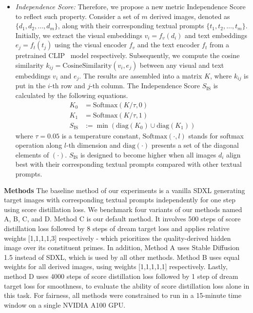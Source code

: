 \begin{itemize}
\item \emph{Independence Score:} Therefore, we propose a new metric Independence Score to reflect such property. Consider a set of $m$ derived images, denoted as $\{d_1, d_2, \ldots, d_m\}$, along with their corresponding textual prompts $\{t_1, t_2, \ldots, t_m\}$. Initially, we extract the visual embeddings $v_i=f_v(d_i)$ and text embeddings $e_j=f_t(t_j)$ using the visual encoder $f_v$ and the text encoder $f_t$ from a pretrained CLIP~\cite{radford2021learning} model respectively. Subsequently, we compute the cosine similarity $k_{ij}=\text{CosineSimilarity}(v_i, e_j)$ between any visual and text embeddings $v_i$ and $e_j$. The results are assembled into a matrix $K$, where $k_{ij}$ is put in the $i$-th row and $j$-th column. The Independence Score $S_\mathrm{IS}$ is calculated by the following equations.
\begin{align}
K_0 &= \mathrm{Softmax}(K / \tau, 0) \\
K_1 &= \mathrm{Softmax}(K / \tau, 1) \\
S_\mathrm{IS} & := \min(\mathrm{diag}(K_0) \cup \mathrm{diag}(K_1))
\end{align}
where $\tau=0.05$ is a temperature constant, $\text{Softmax}(\cdot, l)$ stands for softmax operation along $l$-th dimension and $\text{diag}(\cdot)$ presents a set of the diagonal elements of $(\cdot)$.
$S_\mathrm{IS}$ is designed to become higher when all images $d_i$ align best with their corresponding textual prompts compared with other textual prompts.
\end{itemize}

\noindent\textbf{Methods} \quad The baseline method of our experiments is a vanilla SDXL generating target images with corresponding textual prompts independently for one step using score distillation loss. We benchmark four variants of our methods named A, B, C, and D. Method C is our default method. It involves 500 steps of score distillation loss followed by 8 steps of dream target loss and applies relative weights [1,1,1,1,3] respectively - which prioritizes the quality-derived hidden image over its constituent primes. In addition, Method A uses Stable Diffusion 1.5 instead of SDXL, which is used by all other methods. Method B uses equal weights for all derived images, using weights [1,1,1,1,1] respectively. Lastly, method D uses 4000 steps of score distillation loss followed by 1 step of dream target loss for smoothness, to evaluate the ability of score distillation loss alone in this task.
For fairness, all methods were constrained to run in a 15-minute time window on a single NVIDIA A100 GPU.


